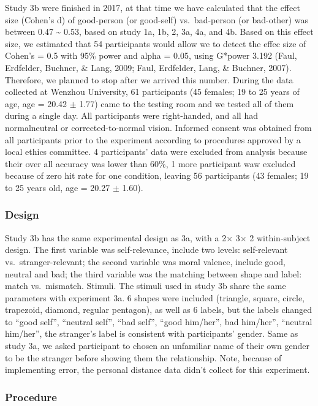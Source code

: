 \documentclass[man]{apa6}
\begin{document}
Study 3b were finished in 2017, at that time we have calculated that the effect size (Cohen's d) of good-person (or good-self) vs.~bad-person (or bad-other) was between 0.47 \textasciitilde{} 0.53, based on study 1a, 1b, 2, 3a, 4a, and 4b. Based on this effect size, we estimated that 54 participants would allow we to detect the effec size of Cohen's = 0.5 with 95\% power and alpha = 0.05, using G*power 3.192 (Faul, Erdfelder, Buchner, \& Lang, 2009; Faul, Erdfelder, Lang, \& Buchner, 2007). Therefore, we planned to stop after we arrived this number. During the data collected at Wenzhou University, 61 participants (45 females; 19 to 25 years of age, age = 20.42 \(\pm\) 1.77) came to the testing room and we tested all of them during a single day. All participants were right-handed, and all had normalneutral or corrected-to-normal vision. Informed consent was obtained from all participants prior to the experiment according to procedures approved by a local ethics committee. 4 participants' data were excluded from analysis because their over all accuracy was lower than 60\%, 1 more participant waw excluded because of zero hit rate for one condition, leaving 56 participants (43 females; 19 to 25 years old, age = 20.27 \(\pm\) 1.60).

\hypertarget{design-1}{%
\subsubsection{Design}\label{design-1}}

Study 3b has the same experimental design as 3a, with a 2× 3× 2 within-subject design. The first variable was self-relevance, include two levels: self-relevant vs.~stranger-relevant; the second variable was moral valence, include good, neutral and bad; the third variable was the matching between shape and label: match vs.~mismatch.
Stimuli. The stimuli used in study 3b share the same parameters with experiment 3a. 6 shapes were included (triangle, square, circle, trapezoid, diamond, regular pentagon), as well as 6 labels, but the labels changed to \enquote{good self}, \enquote{neutral self}, \enquote{bad self}, \enquote{good him/her}, bad him/her'', \enquote{neutral him/her}, the stranger's label is consistent with participants' gender. Same as study 3a, we asked participant to chosen an unfamiliar name of their own gender to be the stranger before showing them the relationship. Note, because of implementing error, the personal distance data didn't collect for this experiment.

\hypertarget{procedure-5}{%
\subsubsection{Procedure}\label{procedure-5}}
\end{document}
